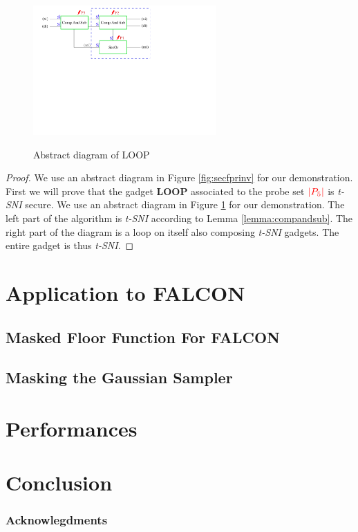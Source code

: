 \documentclass[runningheads]{llncs}
\begin{document}
\begin{figure}[ht]
  \centering
  \includegraphics[width=7cm]{figure/loopinv2.pdf}
  \label{fig:loopinv2}
  \caption{Abstract diagram of LOOP}  
\end{figure}

\begin{proof}
  We use an abstract diagram in Figure \ref{fig:secfprinv} for our demonstration. First we will prove that the gadget \textbf{LOOP} associated to the probe set $\textcolor{red}{|P_5|}$ is \emph{t-SNI} secure.\newline
  We use an abstract diagram in Figure \ref{fig:loopinv2} for our demonstration. The left part of the algorithm is \emph{t-SNI} according to Lemma \ref{lemma:compandsub}. The right part of the diagram is a loop on itself also composing \emph{t-SNI} gadgets. The entire gadget is thus \emph{t-SNI}.
\end{proof}
\section{Application to FALCON}\label{sec:appfalcon}
\subsection{Masked Floor Function For FALCON}
\subsection{Masking the Gaussian Sampler}
\section{Performances}\label{sec:perf}



\section{Conclusion}\label{sec:conclusion}
\subsubsection{Acknowlegdments}
\end{document}
